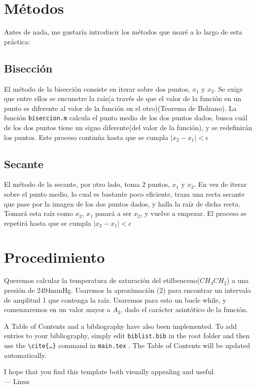 \documentclass[12pt]{article}
\begin{document}
\section{Métodos}
Antes de nada, me gustaría introducir los métodos que usaré a lo largo de esta práctica:
\begin{multicols}{2}
\subsection{Bisección}
El método de la bisección consiste en iterar sobre dos puntos, $x_{1}$ y $x_{2}$. Se exige que entre ellos se encunetre la raíz(a través de que el valor de la función en un punto es diferente al valor de la función en el otro)(Teorema de Bolzano). La función \texttt{biseccion.m} calcula el punto medio de los dos puntos dados, busca cuál de los dos puntos tiene un signo diferente(del valor de la función), y se redefinirán los puntos. Este proceso continúa hasta que se cumpla $|x_{2}-x_{1}|<\epsilon$
\subsection{Secante}
El método de la secante, por otro lado, toma 2 puntos, $x_{1}$ y $x_{2}$. En vez de iterar sobre el punto medio, lo cual es bastante poco eficiente, traza una recta secante que pase por la imagen de los dos puntos dados, y halla la raíz de dicha recta. Tomará esta raíz como $x_{2}$, $x_{1}$ pasará a ser $x_{2}$, y vuelve a empezar. El proceso se repetirá hasta que se cumpla $|x_{2}-x_{1}|<\epsilon$
\end{multicols}
\pagebreak
\section{Procedimiento}
Queremos calcular la temperatura de saturación del etilbenceno($CH_{3}CH_{2}$) a una presión de 2494mmHg. Usaremos la aproximación (2) para encontrar un intervalo de amplitud 1 que contenga la raíz. Usaremos para esto un bucle while, y comenzaremos en un valor mayor a $A_{3}$, dado el carácter asintótico de la función. 


A Table of Contents and a bibliography have also been implemented. To add entries to your bibliography, simply edit \texttt{biblist.bib} in the root folder and then use the \texttt{\textbackslash cite\{\ldots\}} command in \texttt{main.tex} \cite{bibtex}. The Table of Contents will be updated automatically.

I hope that you find this template both visually appealing and useful. \\

\hspace{1 cm}--- Linus

\newpage


\end{document}
